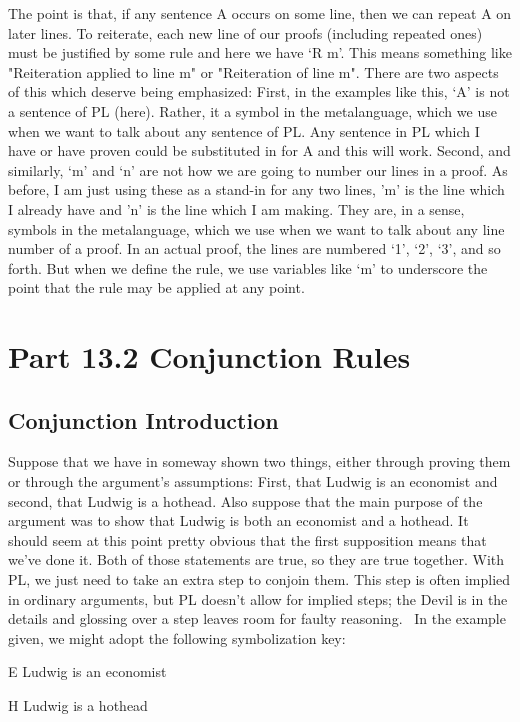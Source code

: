 The point is that, if any sentence A occurs on some line, then we can repeat A on later lines. To reiterate, each new line of our proofs (including repeated ones) must be justified by some rule and here we have ‘R m’. This means something like "Reiteration applied to line m" or "Reiteration of line m". There are two aspects of this which deserve being emphasized: First, in the examples like this, ‘A’ is not a sentence of PL (here). Rather, it a symbol in the metalanguage, which we use when we want to talk about any sentence of PL. Any sentence in PL which I have or have proven could be substituted in for A and this will work. Second, and similarly, ‘m’ and ‘n’ are not how we are going to number our lines in a proof. As before, I am just using these as a stand-in for any two lines, 'm' is the line which I already have and 'n' is the line which I am making. They are, in a sense, symbols in the metalanguage, which we use when we want to talk about any line number of a proof. In an actual proof, the lines are numbered ‘1’, ‘2’, ‘3’, and so forth. But when we define the rule, we use variables like ‘m’ to underscore the point that the rule may be applied at any point.
\section{Part 13.2 Conjunction Rules}
\subsection{Conjunction Introduction}

Suppose that we have in someway shown two things, either through proving them or through the argument's assumptions: First, that Ludwig is an economist and second, that Ludwig is a hothead. Also suppose that the main purpose of the argument was to show that Ludwig is both an economist and a hothead. It should seem at this point pretty obvious that the first supposition means that we've done it. Both of those statements are true, so they are true together. With PL, we just need to take an extra step to conjoin them. This step is often implied in ordinary arguments, but PL doesn't allow for implied steps; the Devil is in the details and glossing over a step leaves room for faulty reasoning.  In the example given, we might adopt the following symbolization key:
\begin{ekey}
\item[E] Ludwig is an economist
\item[H] Ludwig is a hothead
\end{ekey}

